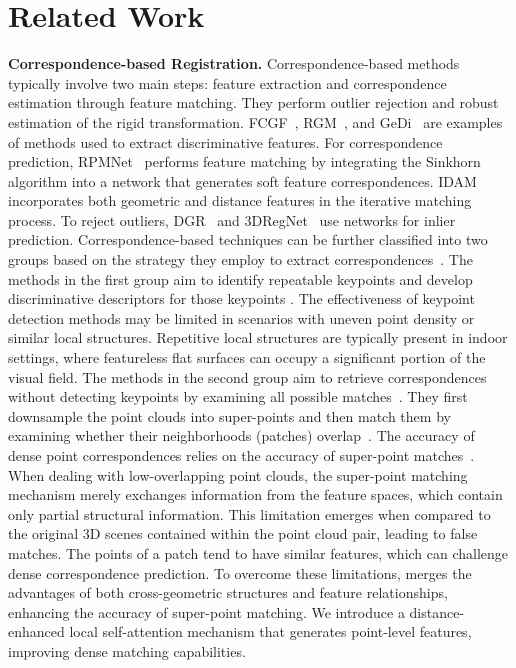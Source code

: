 \section{Related Work}



\noindent\textbf{Correspondence-based Registration.}
Correspondence-based methods typically involve two main steps: feature extraction and correspondence estimation through feature matching. 
They perform outlier rejection and robust estimation of the rigid transformation. 
FCGF~\cite{choy2019fully}, RGM~\cite{fu2021robust}, and GeDi~\cite{GEDI} are examples of methods used to extract discriminative features. 
For correspondence prediction, RPMNet~\cite{yew2020rpm} performs feature matching by integrating the Sinkhorn algorithm into a network that generates soft feature correspondences.
IDAM~\cite{li2019iterative} incorporates both geometric and distance features in the iterative matching process. 
To reject outliers, DGR~\cite{choy2020deep} and 3DRegNet~\cite{pais20203dregnet} use networks for inlier prediction.
Correspondence-based techniques can be further classified into two groups based on the strategy they employ to extract correspondences~\cite{qin2022geometric}. 
The methods in the first group aim to identify repeatable keypoints \cite{bai2020d3feat, huang2021predator} and develop discriminative descriptors for those keypoints \cite{ao2021spinnet, wang2022you, wang2023roreg}. 
The effectiveness of keypoint detection methods may be limited in scenarios with uneven point density or similar local structures. 
Repetitive local structures are typically present in indoor settings, where featureless flat surfaces can occupy a significant portion of the visual field. 
The methods in the second group aim to retrieve correspondences without detecting keypoints by examining all possible matches~\cite{yu2021cofinet, qin2022geometric}. 
They first downsample the point clouds into super-points and then match them by examining whether their neighborhoods (patches) overlap~\cite{mei2021point, zhang2022patchformer, yu2021cofinet}. 
The accuracy of dense point correspondences relies on the accuracy of super-point matches~\cite{qin2022geometric}. 
When dealing with low-overlapping point clouds, the super-point matching mechanism merely exchanges information from the feature spaces, which contain only partial structural information. 
This limitation emerges when compared to the original 3D scenes contained within the point cloud pair, leading to false matches. 
The points of a patch tend to have similar features, which can challenge dense correspondence prediction. 
To overcome these limitations, \ourmethod merges the advantages of both cross-geometric structures and feature relationships, enhancing the accuracy of super-point matching. 
We introduce a distance-enhanced local self-attention mechanism that generates point-level features, improving dense matching capabilities.



